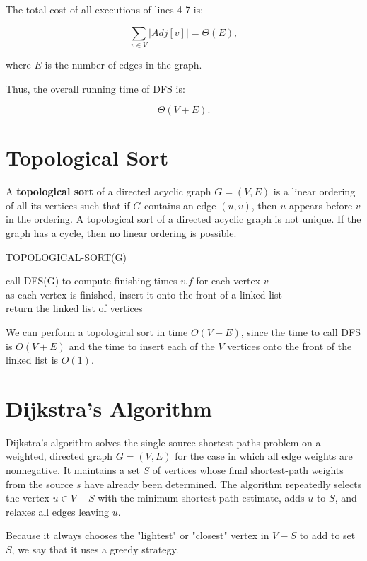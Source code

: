 The total cost of all executions of lines 4-7 is:

$$
\sum_{v \in V} |Adj[v]| = \Theta(E),
$$

where $E$ is the number of edges in the graph.

Thus, the overall running time of DFS is:

$$
\Theta(V + E).
$$

\section{Topological Sort}

A \textbf{topological sort} of a directed acyclic graph $G = (V, E)$ is a linear ordering of all its vertices such that if $G$ contains an edge $(u, v)$, then $u$ appears before $v$ in the ordering. A topological sort of a directed acyclic graph is not unique. If the graph has a cycle, then no linear ordering is possible.

\begin{algorithm}[H]
    \caption{TOPOLOGICAL-SORT(G)}
    call DFS(G) to compute finishing times $v.f$ for each vertex $v$ \\
    as each vertex is finished, insert it onto the front of a linked list \\
    return the linked list of vertices
\end{algorithm}

We can perform a topological sort in time $O(V + E)$, since the time to call DFS is $O(V + E)$ and the time to insert each of the $V$ vertices onto the front of the linked list is $O(1)$.

\section{Dijkstra's Algorithm}

Dijkstra's algorithm solves the single-source shortest-paths problem on a weighted, directed graph $G = (V, E)$ for the case in which all edge weights are nonnegative.
It maintains a set $S$ of vertices whose final shortest-path
weights from the source $s$ have already been determined. The algorithm repeatedly selects the vertex $u \in V - S$
with the minimum shortest-path estimate, adds $u$ to $S$, and relaxes all edges leaving $u$.

Because it always chooses the "lightest" or "closest" vertex in $V - S$ to add to set $S$, we say that it uses a greedy strategy.

